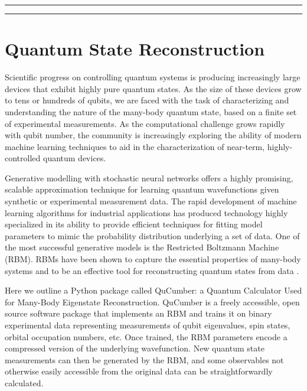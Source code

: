 \documentclass[submission, Phys]{SciPost}
\begin{document}
\vspace{10pt}
\noindent\rule{\textwidth}{1pt}
\tableofcontents\thispagestyle{fancy}
\noindent\rule{\textwidth}{1pt}
\vspace{10pt}


\section{Quantum State Reconstruction}

Scientific progress on controlling quantum systems is producing increasingly large devices that exhibit highly pure quantum states.  As the size of these devices grow to tens or hundreds of qubits, we are faced with the task of characterizing and understanding the nature of the many-body quantum state, based on a finite set of experimental measurements.  As the computational challenge grows rapidly with qubit number, the community is increasingly exploring the ability of modern machine learning techniques to aid in the characterization of near-term, highly-controlled quantum devices.

Generative modelling with stochastic neural networks offers a highly promising, scalable approximation technique for learning quantum wavefunctions given synthetic or experimental measurement data.  The rapid development of machine learning algorithms for industrial applications has produced technology highly specialized in its ability to provide efficient techniques for fitting model parameters to mimic the probability distribution underlying a set of data.  One of the most successful generative models is the Restricted Boltzmann Machine (RBM).  RBMs have been shown to capture the essential properties of many-body systems and to be an effective tool for reconstructing quantum states from data \cite{Torlai2016thermo, torlai2018tomography, CarleoTroyer2017Science}.

Here we outline a Python package called QuCumber: a Quantum Calculator Used for Many-Body Eigenstate Reconstruction.  QuCumber is a freely accessible, open source software package that implements an RBM and trains it on binary experimental data representing measurements of qubit eigenvalues, spin states, orbital occupation numbers, etc.  Once trained, the RBM parameters encode a compressed version of the underlying wavefunction.  New quantum state measurements can then be generated by the RBM, and some observables not otherwise easily accessible from the original data can be straightforwardly calculated.
\end{document}
